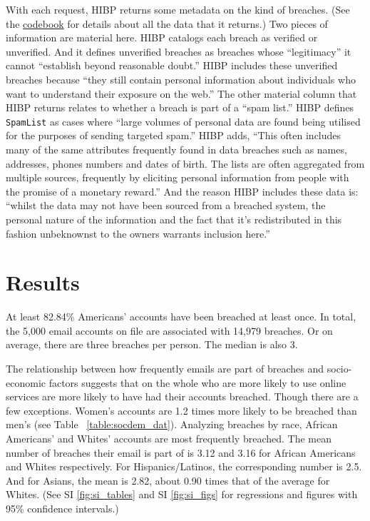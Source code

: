 \documentclass[12pt, letterpaper]{article}
\begin{document}
With each request, HIBP returns some metadata on the kind of breaches. (See the \href{https://github.com/themains/pwned/blob/master/data/hibp\_codebook.xlsx}{codebook} for details about all the data that it returns.) Two pieces of information are material here. HIBP catalogs each breach as verified or unverified. And it defines unverified breaches as breaches whose ``legitimacy'' it cannot ``establish beyond reasonable doubt.'' HIBP includes these unverified breaches because ``they still contain personal information about individuals who want to understand their exposure on the web.'' The other material column that HIBP returns relates to whether a breach is part of a ``spam list.'' HIBP defines \texttt{SpamList} as cases where ``large volumes of personal data are found being utilised for the purposes of sending targeted spam.'' HIBP adds, ``This often includes many of the same attributes frequently found in data breaches such as names, addresses, phones numbers and dates of birth. The lists are often aggregated from multiple sources, frequently by eliciting personal information from people with the promise of a monetary reward.'' And the reason HIBP includes these data is: ``whilst the data may not have been sourced from a breached system, the personal nature of the information and the fact that it's redistributed in this fashion unbeknownst to the owners warrants inclusion here.''

\section*{Results}
At least 82.84\% Americans' accounts have been breached at least once. In total, the 5,000 email accounts on file are associated with 14,979 breaches. Or on average, there are three breaches per person. The median is also 3.

The relationship between how frequently emails are part of breaches and socio-economic factors suggests that on the whole who are more likely to use online services are more likely to have had their accounts breached. Though there are a few exceptions. 
Women's accounts are 1.2 times more likely to be breached than men's (see Table ~\ref{table:socdem_dat}). Analyzing breaches by race, African Americans' and Whites' accounts are most frequently breached. The mean number of breaches their email is part of is 3.12 and 3.16 for African Americans and Whites respectively. For Hispanics/Latinos, the corresponding number is 2.5. And for Asians, the mean is 2.82, about 0.90 times that of the average for Whites. (See SI \ref{fig:si_tables} and SI \ref{fig:si_figs} for regressions and figures with 95\% confidence intervals.)
\end{document}
